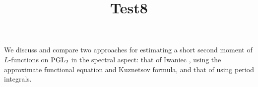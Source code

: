 \documentclass[reqno]{amsart} 
\title{Test8}
\numberwithin{equation}{section}
\numberwithin{theorem}{section}
\begin{document}
\maketitle
\tableofcontents


We discuss and compare two approaches for estimating a short second moment of $L$-functions on $\operatorname{PGL}_2$ in the spectral aspect: that of Iwaniec \cite{Iwaniec1992}, using the approximate functional equation and Kuznetsov formula, and that of \cite{2021arXiv210915230N} using period integrals.




{} 
\end{document}
